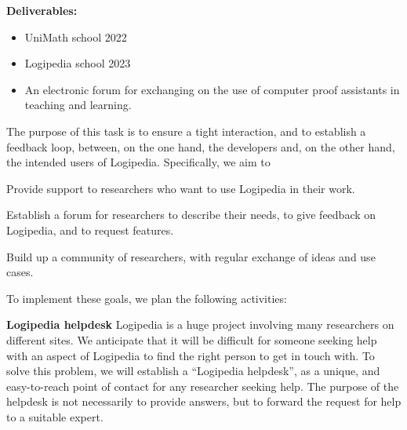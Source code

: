 \begin{workpackage}[id=dissemination,wphases=0-48,type=MGT,
  short=Dissemination,%
  title={Dissemination, communication and exploitation},
  lead=Inr]
\begin{tasklist}
\begin{task}[id=training,
      title=Training Logipedia developers and users,
      lead=Inr,InrRM=2,IrtRM=2]
    \textbf{Deliverables:}
    \begin{itemize}
     \item UniMath school 2022
     \item Logipedia school 2023
     \item An electronic forum for exchanging on the use of computer proof assistants in teaching and learning.
    \end{itemize}
   
  \end{task}

  \begin{task}[id=researchers-club,
      title=Expanding the use of Logipedia in research,
      lead=Bir,BirRM=2]
    The purpose of this task is to ensure a tight interaction, and to establish a feedback loop, between, on the one hand, the developers and, on the other hand, the intended users of Logipedia.
    Specifically, we aim to 
    \begin{compactenum}
     \item Provide support to researchers who want to use Logipedia in their work.
     \item Establish a forum for researchers to describe their needs, to give feedback on Logipedia, and to request features.
     \item Build up a community of researchers, with regular exchange of ideas and use cases.
    \end{compactenum}
    To implement these goals, we plan the following activities:
    \begin{compactenum}
     \item [\textbf{Logipedia helpdesk}] 
     Logipedia is a huge project involving many researchers on different sites. We anticipate that it will be difficult for someone seeking help with an aspect of Logipedia to find the right person to get in touch with.
     To solve this problem, we will establish a ``Logipedia helpdesk'', as a unique, and easy-to-reach point of contact for any researcher seeking help.
     The purpose of the helpdesk is not necessarily to provide answers, but to forward the request for help to a suitable expert.
     

\end{compactenum}
\end{task}
\end{tasklist}
\end{workpackage}
